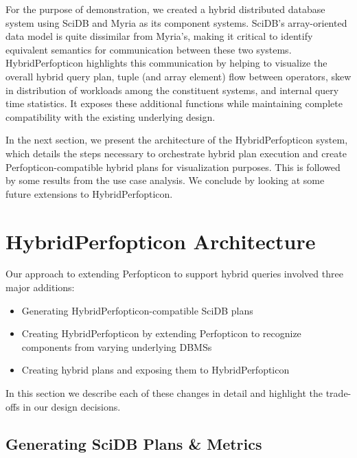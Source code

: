 \documentclass{chi2009}
\begin{document}
For the purpose of demonstration, we created a hybrid distributed database system using SciDB \cite{scidb} and Myria \cite{Myria} as its component systems. SciDB's array-oriented data model is quite dissimilar from Myria's, making it critical to identify equivalent semantics for communication between these two systems. HybridPerfopticon highlights this communication by helping to visualize the overall hybrid query plan, tuple (and array element) flow between operators, skew in distribution of workloads among the constituent systems, and internal query time statistics.  It exposes these additional functions while maintaining complete compatibility with the existing underlying design.

In the next section, we present the architecture of the HybridPerfopticon system, which details the steps necessary to orchestrate hybrid plan execution and create Perfopticon-compatible hybrid plans for visualization purposes. This is followed by some results from the use case analysis. We conclude by looking at some future extensions to HybridPerfopticon.

\section{HybridPerfopticon Architecture}

Our approach to extending Perfopticon to support hybrid queries involved three major additions:

\begin{itemize}
\item Generating HybridPerfopticon-compatible SciDB plans
\item Creating HybridPerfopticon by extending Perfopticon to recognize components from varying underlying DBMSs
\item Creating hybrid plans and exposing them to HybridPerfopticon
\end{itemize}

In this section we describe each of these changes in detail and highlight the trade-offs in our design decisions.

\subsection{Generating SciDB Plans \& Metrics}
\end{document}
